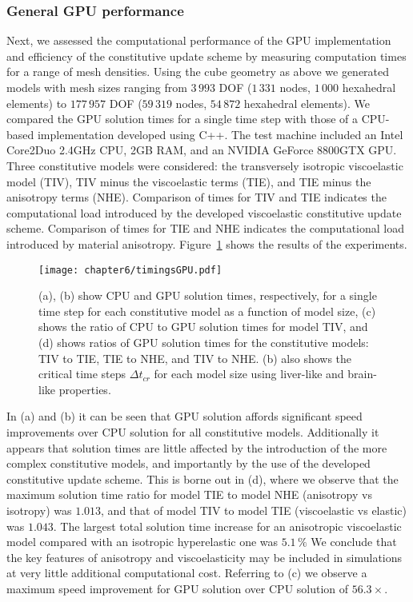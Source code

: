 		\subsubsection*{General GPU performance}
Next, we assessed the computational performance of the GPU implementation and efficiency of the constitutive update scheme by measuring computation times for a range of mesh densities. Using the cube geometry as above we generated models with mesh sizes ranging from $3\,993$ DOF ($1\,331$ nodes, $1\,000$ hexahedral elements) to $177\,957$ DOF ($59\,319$ nodes, $54\,872$ hexahedral elements). We compared the GPU solution times for a single time step with those of a CPU-based implementation developed using C++. The test machine included an Intel Core2Duo 2.4GHz CPU, 2GB RAM, and an NVIDIA GeForce 8800GTX GPU. Three constitutive models were considered: the transversely isotropic viscoelastic model (TIV), TIV minus the viscoelastic terms (TIE), and TIE minus the anisotropy terms (NHE). Comparison of times for TIV and TIE indicates the computational load introduced by the developed viscoelastic constitutive update scheme. Comparison of times for TIE and NHE indicates the computational load introduced by material anisotropy. Figure~\ref{chap6:fig-timingsGPU} shows the results of the experiments. 
%
\begin{figure}[h]
\begin{center}
\texttt{[image: chapter6/timingsGPU.pdf]}
\end{center}
\caption[GPU solution times]{(a), (b) show CPU and GPU solution times, respectively, for a single time step for each constitutive model as a function of model size, (c) shows the ratio of CPU to GPU solution times for model TIV, and (d) shows ratios of GPU solution times for the constitutive models: TIV to TIE, TIE to NHE, and TIV to NHE. (b) also shows the critical time steps $ \Delta t_{cr} $ for each model size using liver-like and brain-like properties.} 
\label{chap6:fig-timingsGPU}
\end{figure}
	
In (a) and (b) it can be seen that GPU solution affords significant speed improvements over CPU solution for all constitutive models. Additionally it appears that solution times are little affected by the introduction of the more complex constitutive models, and importantly by the use of the developed constitutive update scheme. This is borne out in (d), where we observe that the maximum solution time ratio for model TIE to model NHE (anisotropy vs isotropy) was $1.013$, and that of model TIV to model TIE (viscoelastic vs elastic) was $1.043$. The largest total solution time increase for an anisotropic viscoelastic model compared with an isotropic hyperelastic one was $5.1\, \%$ We conclude that the key features of anisotropy and viscoelasticity may be included in simulations at very little additional computational cost. Referring to (c) we observe a maximum speed improvement for GPU solution over CPU solution of $56.3 \times$. 
	
